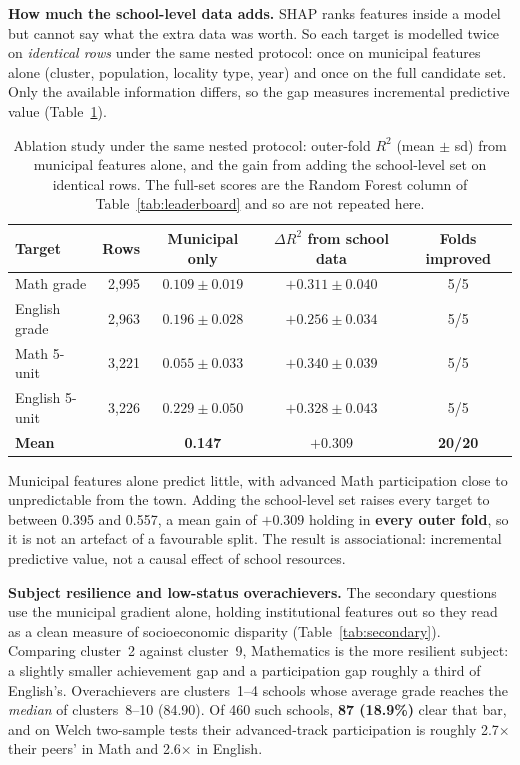 \textbf{How much the school-level data adds.} SHAP ranks features inside a model
but cannot say what the extra data was worth. So each target is modelled twice on
\emph{identical rows} under the same nested protocol: once on municipal features
alone (cluster, population, locality type, year) and once on the full candidate
set. Only the available information differs, so the gap measures incremental
predictive value (Table~\ref{tab:ablation}).
\label{sec:secondary}

\begin{table}[H]
\centering
\footnotesize
\renewcommand{\arraystretch}{1.3}
\caption{Ablation study under the same nested protocol: outer-fold $R^2$
(mean $\pm$ sd) from municipal features alone, and the gain from adding the
school-level set on identical rows. The full-set scores are the Random Forest
column of Table~\ref{tab:leaderboard} and so are not repeated here.}
\label{tab:ablation}
\begin{tabular}{@{}>{\raggedright\arraybackslash}p{3.2cm}rccc@{}}
\toprule
\textbf{Target} & \textbf{Rows} & \textbf{Municipal only} & \textbf{$\Delta R^2$ from school data} & \textbf{Folds improved} \\
\midrule
Math grade              & 2,995 & $0.109\!\pm\!0.019$ & $\mathbf{+0.311\!\pm\!0.040}$ & 5/5 \\
English grade           & 2,963 & $0.196\!\pm\!0.028$ & $\mathbf{+0.256\!\pm\!0.034}$ & 5/5 \\
Math 5-unit             & 3,221 & $0.055\!\pm\!0.033$ & $\mathbf{+0.340\!\pm\!0.039}$ & 5/5 \\
English 5-unit          & 3,226 & $0.229\!\pm\!0.050$ & $\mathbf{+0.328\!\pm\!0.043}$ & 5/5 \\
\midrule
\textbf{Mean} & & \textbf{0.147} & $\mathbf{+0.309}$ & \textbf{20/20} \\
\bottomrule
\end{tabular}
\end{table}

Municipal features alone predict little, with advanced Math participation close
to unpredictable from the town. Adding the school-level set raises every target
to between 0.395 and 0.557, a mean gain of $+0.309$ holding in \textbf{every
outer fold}, so it is not an artefact of a favourable split. The result is
associational: incremental predictive value, not a causal effect of school
resources.

\textbf{Subject resilience and low-status overachievers.} The secondary questions
use the municipal gradient alone, holding institutional features out so they read
as a clean measure of socioeconomic disparity (Table~\ref{tab:secondary}).
Comparing cluster~2 against cluster~9, Mathematics is the more resilient subject:
a slightly smaller achievement gap and a participation gap roughly a third of
English's. Overachievers are clusters~1--4 schools whose average grade reaches
the \emph{median} of clusters~8--10 (84.90). Of 460 such schools, \textbf{87
(18.9\%)} clear that bar, and on Welch two-sample tests their advanced-track
participation is roughly 2.7$\times$ their peers' in Math and 2.6$\times$ in
English.


